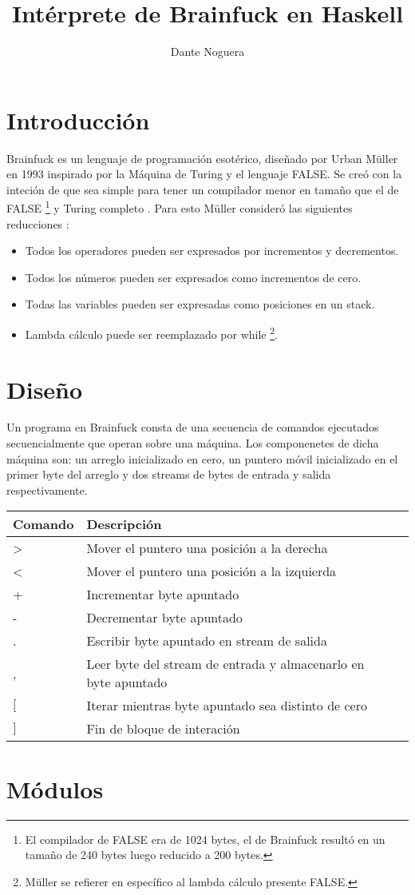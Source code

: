 \documentclass[a4paper, 12pt]{article}
\title{Int\'erprete de Brainfuck en Haskell}
\author{Dante Noguera}
\date{}
\begin{document}
\section*{Introducción}

Brainfuck es un lenguaje de programación esotérico, diseñado por Urban Müller en 1993 inspirado por la Máquina de Turing y el lenguaje FALSE.
Se creó con la inteción de que sea simple para tener un compilador menor en tamaño que el de FALSE \footnote{El compilador de FALSE era de 1024 bytes, el de Brainfuck resultó en un tamaño de 240 bytes luego reducido a 200 bytes.} y Turing completo \cite{w}. 
Para esto Müller consideró las siguientes reducciones \cite{y}:
\begin{itemize}
	\item Todos los operadores pueden ser expresados por incrementos y decrementos.
	\item Todos los números pueden ser expresados como incrementos de cero.
	\item Todas las variables pueden ser expresadas como posiciones en un stack.
	\item Lambda cálculo puede ser reemplazado por while \footnote{Müller se refierer en específico al lambda cálculo presente FALSE.}.
\end{itemize}


\section*{Diseño}

Un programa en Brainfuck consta de una secuencia de comandos ejecutados secuencialmente que operan sobre una máquina. Los componenetes de dicha máquina son: un arreglo inicializado en cero, un puntero móvil inicializado en el primer byte del arreglo y dos streams de bytes de entrada y salida respectivamente.

\begin{center}
\begin{tabular}{ |l|l|l| } 
 \hline
 Comando & Descripción \\
 \hline
 \textgreater & Mover el puntero una posición a la derecha \\ 
 \textless & Mover el puntero una posición a la izquierda \\ 
 + & Incrementar byte apuntado \\ 
 - & Decrementar byte apuntado \\ 
 . & Escribir byte apuntado en stream de salida\\ 
 , & Leer byte del stream de entrada y almacenarlo en byte apuntado \\ 
 $[$ & Iterar mientras byte apuntado sea distinto de cero \\ 
 $]$ & Fin de bloque de interación \\ 
 \hline
\end{tabular}
\end{center}




\section*{Módulos}



\nocite{*}
\printbibliography
\end{document}
